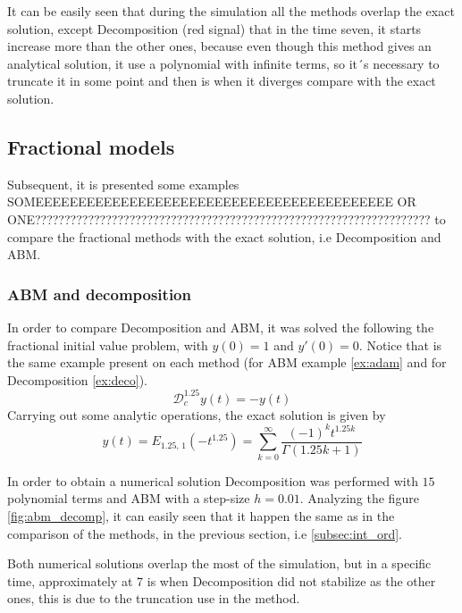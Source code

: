 It can be easily seen that during the simulation all the methods overlap the exact solution, except Decomposition (red signal) that in the time seven, it starts increase more than the other ones, because even though this method gives an analytical solution, it use a polynomial with infinite terms, so it´s necessary to truncate it in some point and then is when it diverges compare with the exact solution.

\subsection{Fractional models}
Subsequent, it is presented some examples SOMEEEEEEEEEEEEEEEEEEEEEEEEEEEEEEEEEEEEEEEEEE OR ONE??????????????????????????????????????????????????????????????????? to compare the fractional methods with the exact solution, i.e Decomposition and ABM.

\subsubsection{ABM and decomposition}

In order to compare Decomposition and ABM, it was solved the following the fractional initial value problem, with $y(0) = 1$ and $y'(0)=0$. Notice that is the same example present on each method (for ABM example \ref{ex:adam} and for Decomposition \ref{ex:deco}). 
\begin{equation}
    \mathcal{D}_c^{1.25}y(t)=-y(t)
\end{equation}
Carrying out some analytic operations, the exact solution is given by
\begin{equation}
    y(t) = E_{1.25,\,1}(-t^{1.25})=\sum_{k=0}^{\infty}\dfrac{(-1)^kt^{1.25k}}{\Gamma(1.25k +1)}
\end{equation}

In order to obtain a numerical solution Decomposition was performed with $15$ polynomial terms and ABM with a step-size $h=0.01$. Analyzing the figure \ref{fig:abm_decomp}, it can easily seen that it happen the same as in the comparison of the methods, in the previous section, i.e \ref{subsec:int_ord}. 

Both numerical solutions overlap the most of the simulation, but in a specific time, approximately at 7 is when Decomposition did not stabilize as the other ones, this is due to the truncation use in the method.


